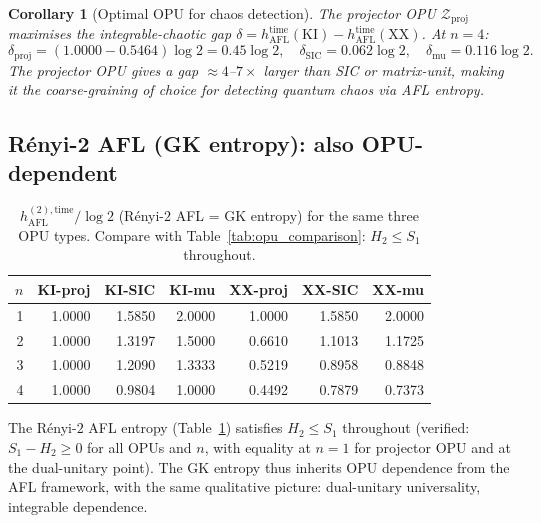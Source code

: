 \documentclass[12pt,a4paper]{article}
\newtheorem{corollary}[theorem]{Corollary}
\begin{document}
\begin{corollary}[Optimal OPU for chaos detection]
  \label{cor:optimal_opu}
  The projector OPU $\mathcal{Z}_{\mathrm{proj}}$ maximises the integrable-chaotic
  gap $\delta = h_{\mathrm{AFL}}^{\mathrm{time}}(\mathrm{KI}) -
  h_{\mathrm{AFL}}^{\mathrm{time}}(\mathrm{XX})$.  At $n=4$:
  \[
    \delta_{\mathrm{proj}} = (1.0000 - 0.5464)\log 2 = 0.45\log 2,
    \quad
    \delta_{\mathrm{SIC}} = 0.062\log 2,
    \quad
    \delta_{\mathrm{mu}} = 0.116\log 2.
  \]
  The projector OPU gives a gap $\approx 4$--$7\times$ larger than SIC or matrix-unit,
  making it the coarse-graining of choice for detecting quantum chaos via AFL entropy.
\end{corollary}

\subsection{R\'enyi-2 AFL (GK entropy): also OPU-dependent}

\begin{table}[h!]
\centering
\caption{$h_{\mathrm{AFL}}^{(2),\mathrm{time}}/\log 2$ (R\'enyi-$2$ AFL = GK entropy)
for the same three OPU types.  Compare with Table~\ref{tab:opu_comparison}: $H_2\leq S_1$
throughout.}
\label{tab:renyi2_opu}
\begin{tabular}{r|rrr|rrr}
\hline
$n$ & KI-proj & KI-SIC & KI-mu & XX-proj & XX-SIC & XX-mu \\
\hline
1 & 1.0000 & 1.5850 & 2.0000 & 1.0000 & 1.5850 & 2.0000 \\
2 & 1.0000 & 1.3197 & 1.5000 & 0.6610 & 1.1013 & 1.1725 \\
3 & 1.0000 & 1.2090 & 1.3333 & 0.5219 & 0.8958 & 0.8848 \\
4 & 1.0000 & 0.9804 & 1.0000 & 0.4492 & 0.7879 & 0.7373 \\
\hline
\end{tabular}
\end{table}

The R\'enyi-$2$ AFL entropy (Table~\ref{tab:renyi2_opu}) satisfies $H_2 \leq S_1$
throughout (verified: $S_1 - H_2 \geq 0$ for all OPUs and $n$, with
equality at $n=1$ for projector OPU and at the dual-unitary point).
The GK entropy thus inherits OPU dependence from the AFL framework, with the
same qualitative picture: dual-unitary universality, integrable dependence.
\end{document}
